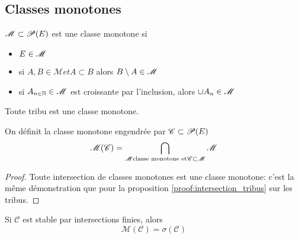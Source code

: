 \subsection{Classes monotones}

\begin{definition}
	$\mathscr{M} \subset \mathscr{P}(E)$ est une classe monotone si
	\begin{itemize}
		\item $E\in \mathscr{M}$
		\item si $A,B \in \mathscr{M} et A \subset B$ alors $B\setminus A \in \mathscr{M}$
		\item si $A_{n\in\mathbb{N}} \in \mathscr{M}$ est croissante par l'inclusion, alors $\cup A_n \in \mathscr{M}$
	\end{itemize}
\end{definition}

\begin{remarque}
	Toute tribu est une classe monotone.
\end{remarque}

\begin{definition}
	On définit la classe monotone engendrée par $\mathscr{C} \subset \mathscr{P}(E)$
	$$ \mathscr{M}(\mathscr{C}) = \bigcap\limits_{\mathscr{M} \text{classe monotone et} \mathscr{C} \subset \mathscr{M}} \mathscr{M} $$
\end{definition}

\begin{proof}
	Toute intersection de classes monotones est une classe monotone: c'est la même démonstration que pour la proposition \ref{proof:intersection_tribus} sur les tribus.
\end{proof}

\begin{theorem}
	Si $\mathscr{C}$ est stable par intersections finies, alors
	$$ \mathscr{M}(\mathscr{C}) = \sigma(\mathscr{C}) $$
\end{theorem}


